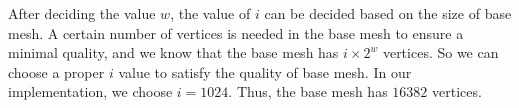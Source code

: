     After deciding the value $w$, the value of $i$ can be decided 
    based on the size of base mesh. 
    A certain number of vertices is needed in the base mesh to ensure 
    a minimal quality, and we know that the base mesh has $i \times 2^{w}$ vertices.
    So we can choose a proper $i$ value to satisfy the quality
    of base mesh. 
    In our implementation, we choose $i= 1024$. 
    Thus, the base mesh has
    $16382$ vertices.
%
%
%
%
%
%


